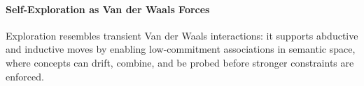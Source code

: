 \paragraph{\textbf{Self-Exploration as Van der Waals Forces}}
Exploration resembles transient Van der Waals interactions: it supports abductive and inductive moves by enabling low-commitment associations in semantic space, where concepts can drift, combine, and be probed before stronger constraints are enforced.
